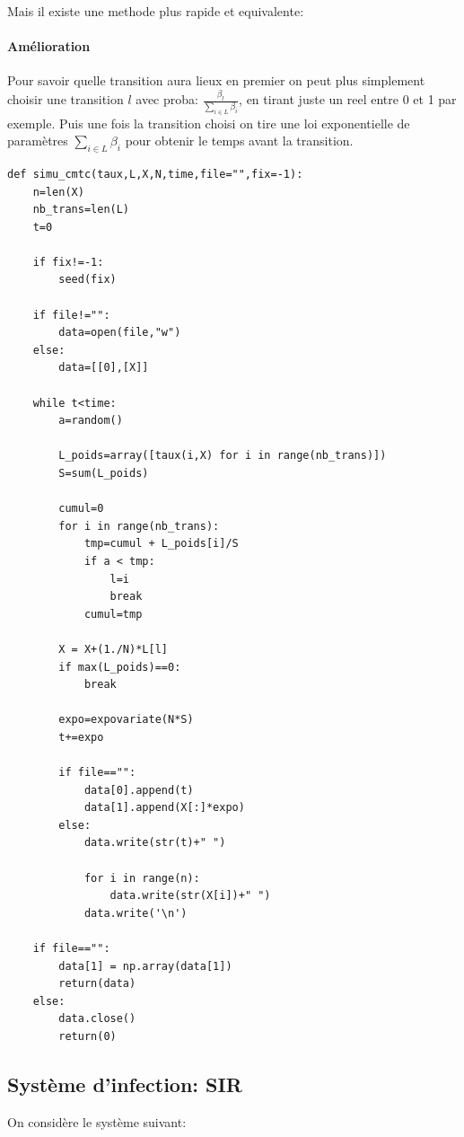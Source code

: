 \documentclass[a4paper]{article}
\begin{document}
Mais il existe  une methode plus rapide et equivalente:

\paragraph{Amélioration}
Pour savoir quelle transition aura lieux en premier on peut plus
simplement choisir une transition $l$ avec proba:
$\frac{\beta_l}{\sum_{i \in L}\beta_i}$, en tirant juste un reel entre 0 et 1 par exemple.
Puis une fois la transition choisi on tire une loi exponentielle de
paramètres $\sum_{i \in L}\beta_i$ pour obtenir le temps avant la
transition.

\newpage

\begin{lstlisting}[frame=single]
  def simu_cmtc(taux,L,X,N,time,file="",fix=-1):
    n=len(X)
    nb_trans=len(L)
    t=0
    
    if fix!=-1:
        seed(fix)

    if file!="":
        data=open(file,"w")
    else:
        data=[[0],[X]]
        
    while t<time:
        a=random()
        
        L_poids=array([taux(i,X) for i in range(nb_trans)])
        S=sum(L_poids)
        
        cumul=0
        for i in range(nb_trans):
            tmp=cumul + L_poids[i]/S
            if a < tmp:
                l=i
                break
            cumul=tmp
        
        X = X+(1./N)*L[l]
        if max(L_poids)==0:
            break
        
        expo=expovariate(N*S)
        t+=expo

        if file=="":
            data[0].append(t)
            data[1].append(X[:]*expo)
        else:
            data.write(str(t)+" ")
            
            for i in range(n):
                data.write(str(X[i])+" ")
            data.write('\n')
    
    if file=="":
        data[1] = np.array(data[1])
        return(data)
    else:
        data.close()
        return(0)
\end{lstlisting}
\newpage

\subsection{Système d'infection: SIR}

On considère le système suivant:
\end{document}
